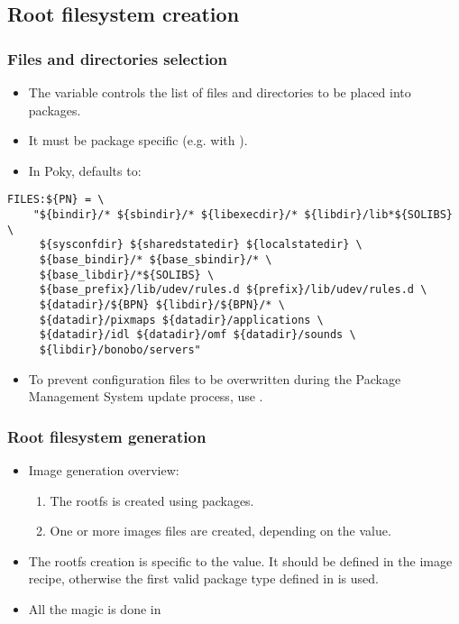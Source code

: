 \subsection{Root filesystem creation}

\begin{frame}[fragile]
  \frametitle{Files and directories selection}
  \begin{itemize}
    \item The  variable controls the list of files and
      directories to be placed into packages.
    \item It must be package specific (e.g. with ).
    \item In Poky, defaults to:
  \end{itemize}
  \begin{block}{}
    \begin{verbatim}
FILES:${PN} = \
    "${bindir}/* ${sbindir}/* ${libexecdir}/* ${libdir}/lib*${SOLIBS} \
     ${sysconfdir} ${sharedstatedir} ${localstatedir} \
     ${base_bindir}/* ${base_sbindir}/* \
     ${base_libdir}/*${SOLIBS} \
     ${base_prefix}/lib/udev/rules.d ${prefix}/lib/udev/rules.d \
     ${datadir}/${BPN} ${libdir}/${BPN}/* \
     ${datadir}/pixmaps ${datadir}/applications \
     ${datadir}/idl ${datadir}/omf ${datadir}/sounds \
     ${libdir}/bonobo/servers"
    \end{verbatim}
  \end{block}
  \begin{itemize}
    \item To prevent configuration files to be overwritten during the
      Package Management System update process, use .
  \end{itemize}
\end{frame}

\begin{frame}
  \frametitle{Root filesystem generation}
  \begin{itemize}
    \item Image generation overview:
      \begin{enumerate}
        \item The rootfs is created using packages.
        \item One or more images files are created, depending on the
           value.
      \end{enumerate}
    \item The rootfs creation is specific to the 
      value. It should be defined in the image recipe, otherwise the
      first valid package type defined in  is
      used.
    \item All the magic is done in
  \end{itemize}
\end{frame}

